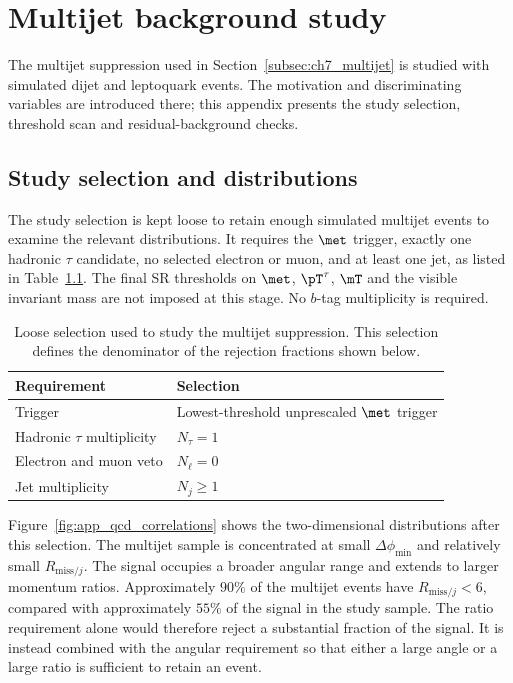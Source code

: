 \chapter{Multijet background study}
\label{App:QCD_bkg_study}

The multijet suppression used in Section~\ref{subsec:ch7_multijet} is studied with simulated dijet and leptoquark events.
The motivation and discriminating variables are introduced there; this appendix presents the study selection, threshold scan and residual-background checks.

\section{Study selection and distributions}
\label{sec:app_qcd_selection}

The study selection is kept loose to retain enough simulated multijet events to examine the relevant distributions.
It requires the $\met$ trigger, exactly one hadronic $\tau$ candidate, no selected electron or muon, and at least one jet, as listed in Table~\ref{tab:app_qcd_preselection}.
The final SR thresholds on $\met$, $\pT^\tau$, $\mT$ and the visible invariant mass are not imposed at this stage.
No $b$-tag multiplicity is required.

\begin{table}[htbp]
    \centering
    \caption{Loose selection used to study the multijet suppression. This selection defines the denominator of the rejection fractions shown below.}
    \label{tab:app_qcd_preselection}
    \begin{tabular}{ll}
        \toprule
        Requirement & Selection \\
        \midrule
        Trigger & Lowest-threshold unprescaled $\met$ trigger \\
        Hadronic $\tau$ multiplicity & $N_\tau=1$ \\
        Electron and muon veto & $N_\ell=0$ \\
        Jet multiplicity & $N_j\geq1$ \\
        \bottomrule
    \end{tabular}
\end{table}

Figure~\ref{fig:app_qcd_correlations} shows the two-dimensional distributions after this selection.
The multijet sample is concentrated at small $\Delta\phi_{\min}$ and relatively small $R_{\mathrm{miss}/j}$.
The signal occupies a broader angular range and extends to larger momentum ratios.
Approximately $90\%$ of the multijet events have $R_{\mathrm{miss}/j}<6$, compared with approximately $55\%$ of the signal in the study sample.
The ratio requirement alone would therefore reject a substantial fraction of the signal.
It is instead combined with the angular requirement so that either a large angle or a large ratio is sufficient to retain an event.

